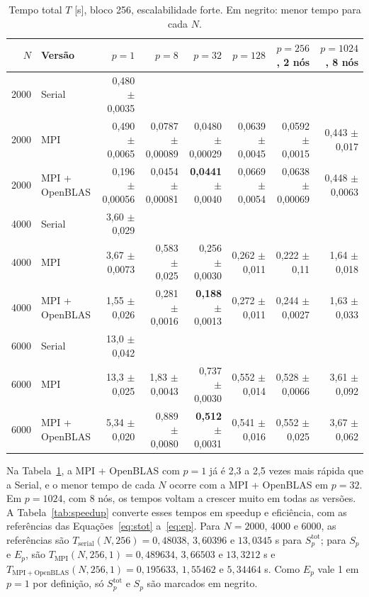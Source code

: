 \documentclass[Portugues]{ic-tese-v3}
\DeclareRobustCommand{\_}{\textunderscore\allowbreak} %
\begin{document}
\begin{table}[H]
\centering\footnotesize
\renewcommand{\arraystretch}{1.05}\setlength{\tabcolsep}{2pt}
\begin{tabular}{|r|l|r|r|r|r|r|r|}
\hline
\textbf{$N$} & \textbf{Versão} & \textbf{$p=1$} & \textbf{$p=8$} & \textbf{$p=32$} & \textbf{$p=128$} & \textbf{$p=256$, 2 nós} & \textbf{$p=1024$, 8 nós} \\
\hline\hline
2000 & Serial & 0,480 $\pm$ 0,0035 &  &  &  &  &  \\ \hline
2000 & MPI & 0,490 $\pm$ 0,0065 & 0,0787 $\pm$ 0,00089 & 0,0480 $\pm$ 0,00029 & 0,0639 $\pm$ 0,0045 & 0,0592 $\pm$ 0,0015 & 0,443 $\pm$ 0,017 \\ \hline
2000 & MPI + OpenBLAS & 0,196 $\pm$ 0,00056 & 0,0454 $\pm$ 0,00081 & \textbf{0,0441} $\pm$ 0,0040 & 0,0669 $\pm$ 0,0054 & 0,0638 $\pm$ 0,00069 & 0,448 $\pm$ 0,0063 \\ \hline\hline
4000 & Serial & 3,60 $\pm$ 0,029 &  &  &  &  &  \\ \hline
4000 & MPI & 3,67 $\pm$ 0,0073 & 0,583 $\pm$ 0,025 & 0,256 $\pm$ 0,0030 & 0,262 $\pm$ 0,011 & 0,222 $\pm$ 0,11 & 1,64 $\pm$ 0,018 \\ \hline
4000 & MPI + OpenBLAS & 1,55 $\pm$ 0,026 & 0,281 $\pm$ 0,0016 & \textbf{0,188} $\pm$ 0,0013 & 0,272 $\pm$ 0,011 & 0,244 $\pm$ 0,0027 & 1,63 $\pm$ 0,033 \\ \hline\hline
6000 & Serial & 13,0 $\pm$ 0,042 &  &  &  &  &  \\ \hline
6000 & MPI & 13,3 $\pm$ 0,025 & 1,83 $\pm$ 0,0043 & 0,737 $\pm$ 0,0030 & 0,552 $\pm$ 0,014 & 0,528 $\pm$ 0,0066 & 3,61 $\pm$ 0,092 \\ \hline
6000 & MPI + OpenBLAS & 5,34 $\pm$ 0,020 & 0,889 $\pm$ 0,0080 & \textbf{0,512} $\pm$ 0,0031 & 0,541 $\pm$ 0,016 & 0,552 $\pm$ 0,025 & 3,67 $\pm$ 0,062 \\ \hline
\end{tabular}
\caption{Tempo total $T$ [s], bloco 256, escalabilidade forte. Em negrito: menor tempo para cada $N$.}
\label{tab:tempos}
\end{table}

Na Tabela~\ref{tab:tempos}, a MPI + OpenBLAS com $p=1$ já é 2,3 a 2,5 vezes mais rápida que a Serial, e o menor tempo de cada $N$ ocorre com a MPI + OpenBLAS em $p=32$. Em $p=1024$, com 8 nós, os tempos voltam a crescer muito em todas as versões. A Tabela~\ref{tab:speedup} converte esses tempos em speedup e eficiência, com as referências das Equações~\eqref{eq:stot} a~\eqref{eq:ep}. Para $N=2000$, 4000 e 6000, as referências são $T_{\mathrm{serial}}(N,256) = 0{,}48038$, $3{,}60396$ e $13{,}0345$ s para $S^{\mathrm{tot}}_p$; para $S_p$ e $E_p$, são $T_{\mathrm{MPI}}(N,256,1) = 0{,}489634$, $3{,}66503$ e $13{,}3212$ s e $T_{\mathrm{MPI+OpenBLAS}}(N,256,1) = 0{,}195633$, $1{,}55462$ e $5{,}34464$ s. Como $E_p$ vale 1 em $p=1$ por definição, só $S^{\mathrm{tot}}_p$ e $S_p$ são marcados em negrito.
\end{document}
